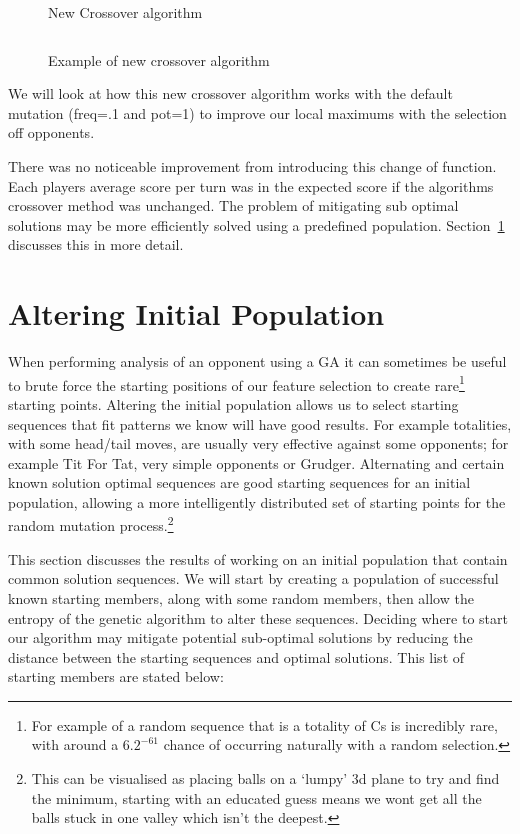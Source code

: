 \begin{figure}
    \inputminted{python}{code_snippets/newCrossover.py}
    \caption{New Crossover algorithm}\label{fig:newCrossover}
\end{figure}

\begin{figure}
    \inputminted{python}{code_snippets/newCrossoverEX.py}
    \caption{Example of new crossover algorithm}\label{fig:newCrossoverEX}
\end{figure}

We will look at how this new crossover algorithm works with the default mutation (freq=.1 and pot=1) to improve our local maximums with the selection off opponents.

There was no noticeable improvement from introducing this change of function.
Each players average score per turn was in the expected score if the algorithms crossover method was unchanged.
The problem of mitigating sub optimal solutions may be more efficiently solved using a predefined population.
Section~\ref{sec:alteringinitialpopulation} discusses this in more detail.

\section{Altering Initial Population}\label{sec:alteringinitialpopulation}
When performing analysis of an opponent using a GA it can sometimes be useful to brute force the starting positions of our feature selection to create rare\footnote{For example of a random sequence that is a totality of Cs is incredibly rare, with around a \(6.2^{-61}\) chance of occurring naturally with a random selection.} starting points.
Altering the initial population allows us to select starting sequences that fit patterns we know will have good results.
For example totalities, with some head/tail moves, are usually very effective against some opponents;
for example Tit For Tat, very simple opponents or Grudger.
Alternating and certain known solution optimal sequences are good starting sequences for an initial population, allowing a more intelligently distributed set of starting points for the random mutation process.\footnote{This can be visualised as placing balls on a `lumpy' 3d plane to try and find the minimum, starting with an educated guess means we wont get all the balls stuck in one valley which isn't the deepest.}

This section discusses the results of working on an initial population that contain common solution sequences.
We will start by creating a population of successful known starting members, along with some random members, then allow the entropy of the genetic algorithm to alter these sequences.
Deciding where to start our algorithm may mitigate potential sub-optimal solutions by reducing the distance between the starting sequences and optimal solutions.
This list of starting members are stated below:

